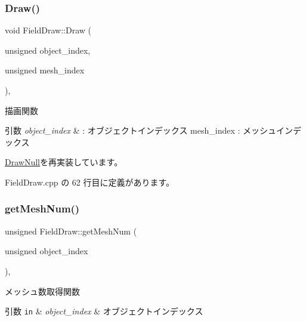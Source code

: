 \subsubsection{\texorpdfstring{Draw()}{Draw()}}
{\footnotesize\ttfamily void Field\+Draw\+::\+Draw (\begin{DoxyParamCaption}\item[{unsigned}]{object\+\_\+index,  }\item[{unsigned}]{mesh\+\_\+index }\end{DoxyParamCaption})\hspace{0.3cm}{\ttfamily [override]}, {\ttfamily [virtual]}}



描画関数 


\begin{DoxyParams}{引数}
{\em object\+\_\+index} & \+: オブジェクトインデックス mesh\+\_\+index \+: メッシュインデックス \\
\hline
\end{DoxyParams}


\mbox{\hyperlink{class_draw_null_a72ac0b7dc40b1469582419dcc5b0e114}{Draw\+Null}}を再実装しています。



 Field\+Draw.\+cpp の 62 行目に定義があります。

\mbox{\label{class_field_draw_a0894ddd73716f0db8ceed4b7d89f23fd}} 
\subsubsection{\texorpdfstring{get\+Mesh\+Num()}{getMeshNum()}}
{\footnotesize\ttfamily unsigned Field\+Draw\+::get\+Mesh\+Num (\begin{DoxyParamCaption}\item[{unsigned}]{object\+\_\+index }\end{DoxyParamCaption})\hspace{0.3cm}{\ttfamily [override]}, {\ttfamily [virtual]}}



メッシュ数取得関数 


\begin{DoxyParams}[1]{引数}
\mbox{\tt in}  & {\em object\+\_\+index} & オブジェクトインデックス \\
\hline
\end{DoxyParams}

